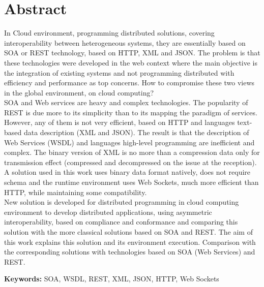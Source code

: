 
\section*{Abstract}


In Cloud environment, programming distributed solutions, covering interoperability between heterogeneous systems,
they are essentially based on SOA or REST technology, based on HTTP, XML and JSON. The problem is that these technologies
were developed in the web context where the main objective is the integration of existing systems and not programming
distributed with efficiency and performance as top concerns. How to compromise these two views in the global environment,
on cloud computing?\\

SOA and Web services are heavy and complex technologies. The popularity of REST is due more to its simplicity than to its
mapping the paradigm of services. However, any of them is not very efficient, based on HTTP and languages
text-based data description (XML and JSON). The result is that the description of Web Services (WSDL) and languages
high-level programming are inefficient and complex. The binary version of XML is no more than a compression
data only for transmission effect (compressed and decompressed on the issue at the reception). A solution used in this
work uses binary data format natively, does not require schema and the runtime environment uses Web Sockets,
much more efficient than HTTP, while maintaining some compatibility.\\

New solution is developed for distributed programming in cloud computing environment to develop
distributed applications, using  asymmetric interoperability, based on compliance and conformance and comparing this solution with the more classical solutions based on SOA and REST. The aim of this work explains this solution and its environment execution. Comparison with the corresponding solutions with technologies based on SOA (Web Services)
and REST.

\vfill

\textbf{\Large Keywords:} SOA, WSDL, REST, XML, JSON, HTTP, Web Sockets
